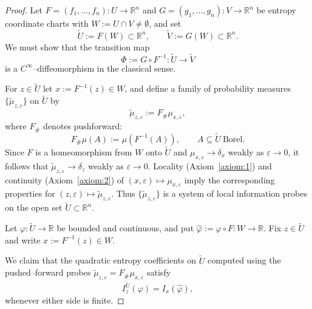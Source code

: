 \documentclass[11pt]{amsart}
\theoremstyle{definition}
\theoremstyle{remark}
\begin{document}
\begin{proof}
Let $F=(f_1,\dots,f_n):U\to\mathbb{R}^n$ and $G=(g_1,\dots,g_n):V\to\mathbb{R}^n$ be entropy
coordinate charts with $W:=U\cap V\neq\emptyset$, and set
\[
\widetilde U := F(W)\subset\mathbb{R}^n,\qquad \widetilde V := G(W)\subset\mathbb{R}^n.
\]
We must show that the transition map
\[
\Phi := G\circ F^{-1} : \widetilde U \longrightarrow \widetilde V
\]
is a $C^\infty$–diffeomorphism in the classical sense.

For $z\in\widetilde U$ let $x:=F^{-1}(z)\in W$, and define a family of probability measures
$\{\widetilde\mu_{z,\varepsilon}\}$ on $\widetilde U$ by
\[
\widetilde\mu_{z,\varepsilon} := F_\#\mu_{x,\varepsilon},
\]
where $F_\#$ denotes pushforward:
\[
F_\#\mu(A) := \mu(F^{-1}(A)),\qquad A\subseteq \widetilde U\ \text{Borel}.
\]
Since $F$ is a homeomorphism from $W$ onto $\widetilde U$
and $\mu_{x,\varepsilon}\to\delta_x$ weakly as $\varepsilon\to0$, it follows that
$\widetilde\mu_{z,\varepsilon}\to\delta_z$ weakly as $\varepsilon\to0$. Locality (Axiom~\ref{axiom:1}) and
continuity (Axiom~\ref{axiom:2}) of $(x,\varepsilon)\mapsto\mu_{x,\varepsilon}$ imply the corresponding
properties for $(z,\varepsilon)\mapsto\widetilde\mu_{z,\varepsilon}$. Thus $\{\widetilde\mu_{z,\varepsilon}\}$
is a system of local information probes on the open set $\widetilde U\subset\mathbb{R}^n$.

Let $\varphi:\widetilde U\to\mathbb{R}$ be bounded and continuous, and put
$\widehat\varphi := \varphi\circ F : W\to\mathbb{R}$. Fix $z\in\widetilde U$ and write $x:=F^{-1}(z)\in W$.

We claim that the quadratic entropy coefficients on $\widetilde U$ computed using the pushed--forward probes
$\widetilde\mu_{z,\varepsilon}=F_\#\mu_{x,\varepsilon}$ satisfy
\begin{equation}\label{eq:Ent-push}
I^{\widetilde U}_z(\varphi)= I_x(\widehat\varphi),
\end{equation}
whenever either side is finite.


\end{proof}
\end{document}
